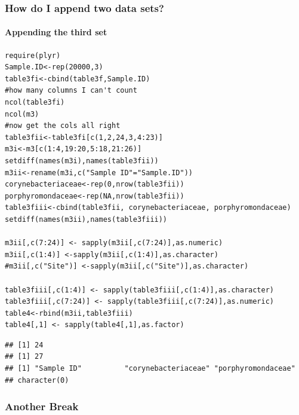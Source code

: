 \documentclass[12pt]{beamer}\usepackage[]{graphicx}\usepackage[]{color}
\makeatletter
\newenvironment{kframe}{%
 \def\at@end@of@kframe{}%
 \ifinner\ifhmode%
  \def\at@end@of@kframe{\end{minipage}}%
  \begin{minipage}{\columnwidth}%
 \fi\fi%
 \def\FrameCommand##1{\hskip\@totalleftmargin \hskip-\fboxsep
 \colorbox{shadecolor}{##1}\hskip-\fboxsep
     \hskip-\linewidth \hskip-\@totalleftmargin \hskip\columnwidth}%
 \MakeFramed {\advance\hsize-\width
   \@totalleftmargin\z@ \linewidth\hsize
   \@setminipage}}%
 {\par\unskip\endMakeFramed%
 \at@end@of@kframe}
\newenvironment{knitrout}{}{} %
\makeatother
\begin{document}
\begin{frame}[fragile]
  \frametitle{How do I append two data sets?}
  \framesubtitle{Appending the third set}  
\begin{lstlisting} 
require(plyr)
Sample.ID<-rep(20000,3)
table3fi<-cbind(table3f,Sample.ID)
#how many columns I can't count
ncol(table3fi)
ncol(m3)
#now get the cols all right
table3fii<-table3fi[c(1,2,24,3,4:23)]
m3i<-m3[c(1:4,19:20,5:18,21:26)]
setdiff(names(m3i),names(table3fii))
m3ii<-rename(m3i,c("Sample ID"="Sample.ID"))
corynebacteriaceae<-rep(0,nrow(table3fii))
porphyromondaceae<-rep(NA,nrow(table3fii))
table3fiii<-cbind(table3fii, corynebacteriaceae, porphyromondaceae)
setdiff(names(m3ii),names(table3fiii))

m3ii[,c(7:24)] <- sapply(m3ii[,c(7:24)],as.numeric)
m3ii[,c(1:4)] <-sapply(m3ii[,c(1:4)],as.character)
#m3ii[,c("Site")] <-sapply(m3ii[,c("Site")],as.character)

table3fiii[,c(1:4)] <- sapply(table3fiii[,c(1:4)],as.character)
table3fiii[,c(7:24)] <- sapply(table3fiii[,c(7:24)],as.numeric)
table4<-rbind(m3ii,table3fiii)
table4[,1] <- sapply(table4[,1],as.factor)
\end{lstlisting}
  
\begin{knitrout}
\color{fgcolor}\begin{kframe}


{\ttfamily\noindent\itshape\color{messagecolor}{\#\# Loading required package: plyr}}\begin{verbatim}
## [1] 24
## [1] 27
## [1] "Sample ID"          "corynebacteriaceae" "porphyromondaceae"
## character(0)
\end{verbatim}
\end{kframe}
\end{knitrout}
\end{frame}

\begin{frame}
  \frametitle{Another Break}
\end{frame}


\end{document}
